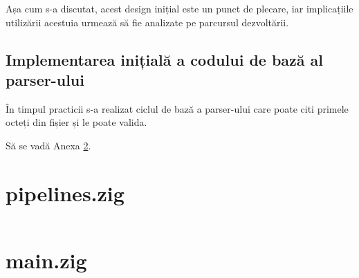 \documentclass[a4paper,12pt]{report}
\begin{document}
Așa cum s-a discutat, acest design inițial este un punct de plecare,
iar implicațiile utilizării acestuia urmează să fie analizate pe parcursul dezvoltării.

\subsection{Implementarea inițială a codului de bază al parser-ului}

În timpul practicii s-a realizat ciclul de bază a parser-ului care poate citi
primele octeți din fișier și le poate valida.

Să se vadă Anexa \ref{appendix:parser_prototype}.


\newpage
{}




\appendix

\renewcommand{\thechapter}{\arabic{chapter}}

\setcounter{chapter}{1}


\section{pipelines.zig}\label{appendix:pipelines_prototype}
\inputminted{zig}{../src/pipelines.zig}

\clearpage\section{main.zig}\label{appendix:parser_prototype}
\inputminted{zig}{../src/main.zig}
\end{document}
